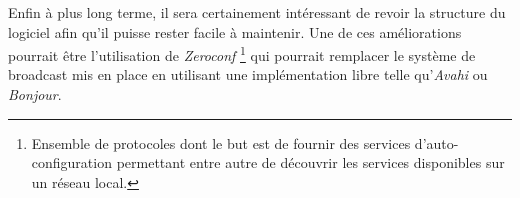 Enfin à plus long terme, il sera certainement intéressant de revoir la
structure du logiciel afin qu'il puisse rester facile à maintenir.
Une de ces améliorations pourrait être l'utilisation de \emph{Zeroconf}
\footnote{Ensemble de protocoles dont le but est de fournir des services
d'auto-configuration permettant entre autre de découvrir les services
disponibles sur un réseau local.} qui pourrait remplacer le système de
broadcast mis en place en utilisant une implémentation libre telle
qu'\emph{Avahi}\cite{avahi} ou \emph{Bonjour}\cite{bonjour}.